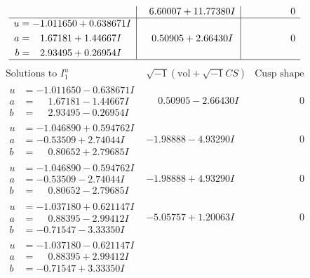 \documentclass[1p]{elsarticle_modified}
\theoremstyle{definition}
\newcommand{\I}{\sqrt{-1}}
\begin{document}
$$\begin{array}{c|c|c}
 & \phantom{-}6.60007 + 11.77380 I & \phantom{-0.000000 } 0 \\ \hline\begin{aligned}
u &= -1.011650 + 0.638671 I \\
a &= \phantom{-}1.67181 + 1.44667 I \\
b &= \phantom{-}2.93495 + 0.26954 I\end{aligned}
 & \phantom{-}0.50905 + 2.66430 I & \phantom{-0.000000 } 0\\
 \hline 
 \end{array}$$\newpage$$\begin{array}{c|c|c}  
\text{Solutions to }I^u_{1}& \I (\text{vol} + \sqrt{-1}CS) & \text{Cusp shape}\\
 \hline 
\begin{aligned}
u &= -1.011650 - 0.638671 I \\
a &= \phantom{-}1.67181 - 1.44667 I \\
b &= \phantom{-}2.93495 - 0.26954 I\end{aligned}
 & \phantom{-}0.50905 - 2.66430 I & \phantom{-0.000000 } 0 \\ \hline\begin{aligned}
u &= -1.046890 + 0.594762 I \\
a &= -0.53509 + 2.74044 I \\
b &= \phantom{-}0.80652 + 2.79685 I\end{aligned}
 & -1.98888 - 4.93290 I & \phantom{-0.000000 } 0 \\ \hline\begin{aligned}
u &= -1.046890 - 0.594762 I \\
a &= -0.53509 - 2.74044 I \\
b &= \phantom{-}0.80652 - 2.79685 I\end{aligned}
 & -1.98888 + 4.93290 I & \phantom{-0.000000 } 0 \\ \hline\begin{aligned}
u &= -1.037180 + 0.621147 I \\
a &= \phantom{-}0.88395 - 2.99412 I \\
b &= -0.71547 - 3.33350 I\end{aligned}
 & -5.05757 + 1.20063 I & \phantom{-0.000000 } 0 \\ \hline\begin{aligned}
u &= -1.037180 - 0.621147 I \\
a &= \phantom{-}0.88395 + 2.99412 I \\
b &= -0.71547 + 3.33350 I\end{aligned}

\end{array}$$
\end{document}
